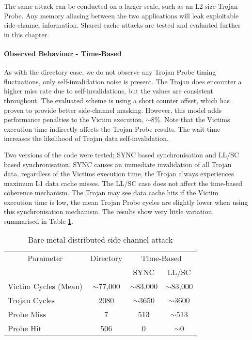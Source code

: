 				The same attack can be conducted on a larger scale, such as an L2 size Trojan Probe. Any memory aliasing between the two applications will leak exploitable side-channel information. Shared cache attacks are tested and evaluated further in this chapter.

			\paragraph{Observed Behaviour - Time-Based}
				As with the directory case, we do not observe any Trojan Probe timing fluctuations, only self-invalidation noise is present. The Trojan does encounter a higher miss rate due to self-invalidations, but the values are consistent throughout. The evaluated scheme is using a short counter offset, which has proven to provide better side-channel masking. However, this model adds performance penalties to the Victim execution, $\sim$8\%. 
				Note that the Victims execution time indirectly affects the Trojan Probe results. The wait time increases the likelihood of Trojan data self-invalidation.
				
				Two versions of the code were tested; SYNC based synchronisation and LL/SC based synchronisation. SYNC causes an immediate invalidation of all Trojan data, regardless of the Victims execution time, the Trojan always experiences maximum L1 data cache misses. The LL/SC case does not affect the time-based coherence mechanism. The Trojan may see data cache hits if the Victim execution time is low, the mean Trojan Probe cycles are slightly lower when using this synchronisation mechanism. The results show very little variation, summarised in Table \ref{split_core_results}. 
			
			\begin{table}[!h]	
			\begin{center}					
			\begin{tabular}{|l||c||c|c|}
				\hline
				\multicolumn{1}{|c||}{Parameter} & Directory & \multicolumn{2}{|c|}{Time-Based} \\
				\cline{3-4}
				& & SYNC & LL/SC \\
				\hline
				\hline
				Victim Cycles (Mean) & $\sim$77,000 & $\sim$83,000 & $\sim$83,000 \\
				Trojan Cycles & 2080 & $\sim$3650 & $\sim$3600 \\
				Probe Miss & 7 & 513 & $\sim$513 \\
				Probe Hit & 506 & 0 & $\sim$0 \\
				\hline
			\end{tabular}
			\caption{Bare metal distributed side-channel attack}
			\label{split_core_results}
			\end{center} 
			\end{table}


